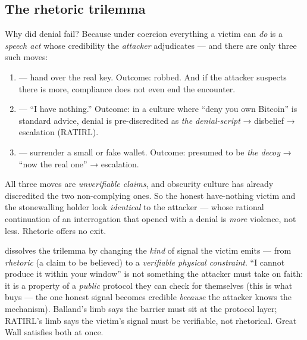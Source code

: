 \documentclass[a4paper,11pt]{report}
\begin{document}
\subsection{The rhetoric trilemma}
Why did denial fail? Because under coercion everything a victim can \emph{do} is
a \emph{speech act} whose credibility the \emph{attacker} adjudicates — and there
are only three such moves:

\begin{enumerate}[leftmargin=1.6em,nosep]
\item {} — hand over the real key. Outcome: robbed. And if the
attacker suspects there is more, compliance does not even end the encounter.
\item {} — ``I have nothing.'' Outcome: in a culture where ``deny you
own Bitcoin'' is standard advice, denial is pre-discredited as \emph{the
denial-script} → disbelief → escalation (RATIRL).
\item {} — surrender a small or fake wallet. Outcome: presumed to be
\emph{the decoy} → ``now the real one'' → escalation.
\end{enumerate}

\begin{keyidea}
All three moves are \emph{unverifiable claims}, and obscurity culture has already
discredited the two non-complying ones. So the honest have-nothing victim and the
stonewalling holder look \emph{identical} to the attacker — whose rational
continuation of an interrogation that opened with a denial is \emph{more}
violence, not less. Rhetoric offers no exit.
\end{keyidea}

\noindent \GW{} dissolves the trilemma by changing the \emph{kind} of signal the
victim emits — from \emph{rhetoric} (a claim to be believed) to a
\emph{verifiable physical constraint}. ``I cannot produce it within your window''
is not something the attacker must take on faith: it is a property of a
\emph{public} protocol they can check for themselves (this is what
 buys — the one honest signal becomes credible \emph{because}
the attacker knows the mechanism). Balland's limb says the barrier must sit at the
protocol layer; RATIRL's limb says the victim's signal must be verifiable, not
rhetorical. Great Wall satisfies both at once.

\end{document}
